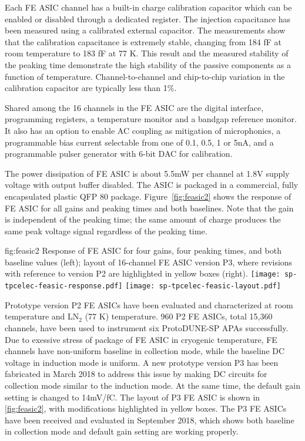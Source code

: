Each FE ASIC channel has a built-in charge calibration capacitor which can be enabled or disabled through a dedicated register. The injection capacitance has been measured using a calibrated external capacitor. The measurements show that the calibration capacitance is extremely stable, changing from 184 fF at room temperature to 183 fF at 77 K. This result and the measured stability of the peaking time demonstrate the high stability of the passive components as a function of temperature. Channel-to-channel and chip-to-chip variation in the calibration capacitor are typically less than 1\%.

Shared among the 16 channels in the FE ASIC are the digital interface, programming registers, a temperature monitor and a bandgap reference monitor. It also has an option to enable AC coupling as mitigation of microphonics, a programmable bias current selectable from one of 0.1, 0.5, 1 or 5nA, and a programmable pulser generator with 6-bit DAC for calibration. 

The power dissipation of FE ASIC is about 5.5mW per channel at 1.8V supply voltage with output buffer disabled. The ASIC is packaged in a commercial, fully encapsulated plastic QFP 80 package. Figure~\ref{fig:feasic2} shows the response of FE ASIC for all gains and peaking times and both baselines. Note that the gain is independent of the peaking time; the same amount of charge produces the same peak voltage signal regardless of the peaking time.

\begin{dunefigure}
{fig:feasic2}
{Response of FE ASIC for four gains, four peaking times, and both baseline values (left); layout of 16-channel FE ASIC version P3, where revisions with reference to version P2 are highlighted in yellow boxes (right).}
\texttt{[image: sp-tpcelec-feasic-response.pdf]}
\texttt{[image: sp-tpcelec-feasic-layout.pdf]}
\end{dunefigure}

Prototype version P2 FE ASICs have been evaluated and characterized at room temperature and LN$_2$ (77 K) temperature. 960 P2 FE ASICs, total 15,360 channels, have been used to instrument six ProtoDUNE-SP APAs successfully. Due to exessive stress of package of FE ASIC in cryogenic temperature, FE channels have non-uniform baseline in collection mode, while the baseline DC voltage in induction mode is uniform. A new prototype version P3 has been fabricated in March 2018 to address this issue by making DC circuits for collection mode similar to the induction mode. At the same time, the default gain setting is changed to 14mV/fC. The layout of P3 FE ASIC is shown in \ref{fig:feasic2}, with modifications highlighted in yellow boxes. The P3 FE ASICs have been received and evaluated in September 2018, which shows both baseline in collection mode and default gain setting are working properly.

